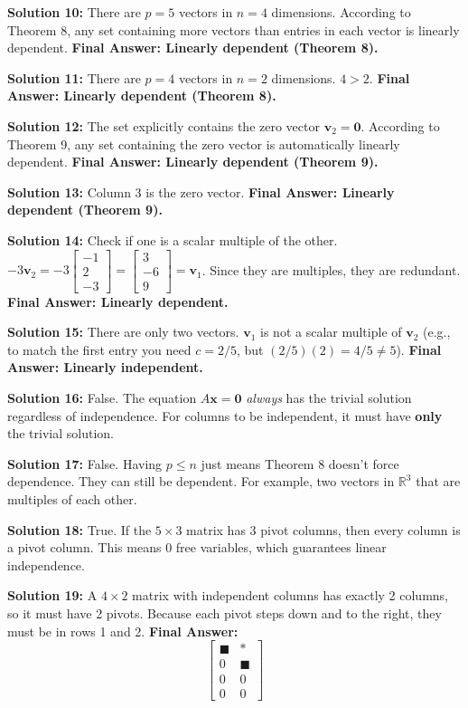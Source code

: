 \documentclass[12pt]{article}
\begin{document}
\textbf{Solution 10:} There are $p = 5$ vectors in $n = 4$ dimensions. According to Theorem 8, any set containing more vectors than entries in each vector is linearly dependent. \textbf{Final Answer: Linearly dependent (Theorem 8).}

\textbf{Solution 11:} There are $p = 4$ vectors in $n = 2$ dimensions. $4 > 2$. \textbf{Final Answer: Linearly dependent (Theorem 8).}

\textbf{Solution 12:} The set explicitly contains the zero vector $\mathbf{v}_2 = \mathbf{0}$. According to Theorem 9, any set containing the zero vector is automatically linearly dependent. \textbf{Final Answer: Linearly dependent (Theorem 9).}

\textbf{Solution 13:} Column 3 is the zero vector. \textbf{Final Answer: Linearly dependent (Theorem 9).}

\textbf{Solution 14:} Check if one is a scalar multiple of the other. $-3\mathbf{v}_2 = -3 \begin{bmatrix} -1 \\ 2 \\ -3 \end{bmatrix} = \begin{bmatrix} 3 \\ -6 \\ 9 \end{bmatrix} = \mathbf{v}_1$. Since they are multiples, they are redundant. \textbf{Final Answer: Linearly dependent.}

\textbf{Solution 15:} There are only two vectors. $\mathbf{v}_1$ is not a scalar multiple of $\mathbf{v}_2$ (e.g., to match the first entry you need $c=2/5$, but $(2/5)(2) = 4/5 \neq 5$). \textbf{Final Answer: Linearly independent.}

\textbf{Solution 16:} False. The equation $A\mathbf{x} = \mathbf{0}$ \textit{always} has the trivial solution regardless of independence. For columns to be independent, it must have \textbf{only} the trivial solution.

\textbf{Solution 17:} False. Having $p \leq n$ just means Theorem 8 doesn't force dependence. They can still be dependent. For example, two vectors in $\mathbb{R}^3$ that are multiples of each other.

\textbf{Solution 18:} True. If the $5 \times 3$ matrix has 3 pivot columns, then every column is a pivot column. This means 0 free variables, which guarantees linear independence.

\textbf{Solution 19:} A $4 \times 2$ matrix with independent columns has exactly 2 columns, so it must have 2 pivots. Because each pivot steps down and to the right, they must be in rows 1 and 2. \textbf{Final Answer:}
$$ \begin{bmatrix} \blacksquare & * \\ 0 & \blacksquare \\ 0 & 0 \\ 0 & 0 \end{bmatrix} $$
\end{document}
